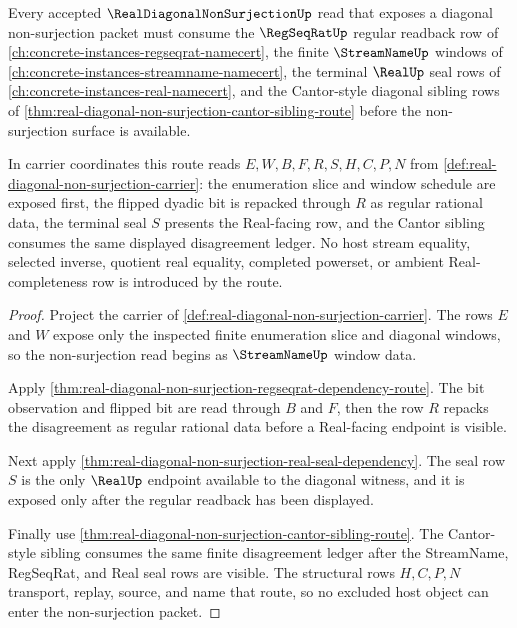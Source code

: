 \begin{theorem}
\label{thm:real-diagonal-non-surjection-regseqrat-route}
Every accepted $\RealDiagonalNonSurjectionUp$ read that exposes a diagonal non-surjection packet must consume the $\RegSeqRatUp$ regular readback row of \autoref{ch:concrete-instances-regseqrat-namecert}, the finite $\StreamNameUp$ windows of \autoref{ch:concrete-instances-streamname-namecert}, the terminal $\RealUp$ seal rows of \autoref{ch:concrete-instances-real-namecert}, and the Cantor-style diagonal sibling rows of \autoref{thm:real-diagonal-non-surjection-cantor-sibling-route} before the non-surjection surface is available.

In carrier coordinates this route reads $E,W,B,F,R,S,H,C,P,N$ from \autoref{def:real-diagonal-non-surjection-carrier}: the enumeration slice and window schedule are exposed first, the flipped dyadic bit is repacked through $R$ as regular rational data, the terminal seal $S$ presents the Real-facing row, and the Cantor sibling consumes the same displayed disagreement ledger. No host stream equality, selected inverse, quotient real equality, completed powerset, or ambient Real-completeness row is introduced by the route.
\end{theorem}
\begin{proof}
Project the carrier of \autoref{def:real-diagonal-non-surjection-carrier}. The rows $E$ and $W$ expose only the inspected finite enumeration slice and diagonal windows, so the non-surjection read begins as $\StreamNameUp$ window data.

Apply \autoref{thm:real-diagonal-non-surjection-regseqrat-dependency-route}. The bit observation and flipped bit are read through $B$ and $F$, then the row $R$ repacks the disagreement as regular rational data before a Real-facing endpoint is visible.

Next apply \autoref{thm:real-diagonal-non-surjection-real-seal-dependency}. The seal row $S$ is the only $\RealUp$ endpoint available to the diagonal witness, and it is exposed only after the regular readback has been displayed.

Finally use \autoref{thm:real-diagonal-non-surjection-cantor-sibling-route}. The Cantor-style sibling consumes the same finite disagreement ledger after the StreamName, RegSeqRat, and Real seal rows are visible. The structural rows $H,C,P,N$ transport, replay, source, and name that route, so no excluded host object can enter the non-surjection packet.
\end{proof}
